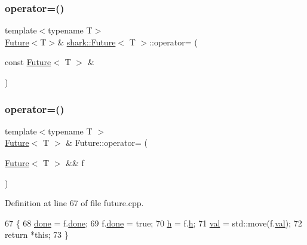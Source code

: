 \subsubsection{\texorpdfstring{operator=()}{operator=()}\hspace{0.1cm}{\footnotesize\ttfamily [1/2]}}
{\footnotesize\ttfamily template$<$typename T$>$ \\
\hyperlink{structshark_1_1_future}{Future}$<$T$>$\& \hyperlink{structshark_1_1_future}{shark\+::\+Future}$<$ T $>$\+::operator= (\begin{DoxyParamCaption}\item[{const \hyperlink{structshark_1_1_future}{Future}$<$ T $>$ \&}]{ }\end{DoxyParamCaption})\hspace{0.3cm}{\ttfamily [delete]}}

\hypertarget{structshark_1_1_future_a660602bfa8a6096020931f35f8d7a7a1}{}\label{structshark_1_1_future_a660602bfa8a6096020931f35f8d7a7a1} 
\subsubsection{\texorpdfstring{operator=()}{operator=()}\hspace{0.1cm}{\footnotesize\ttfamily [2/2]}}
{\footnotesize\ttfamily template$<$typename T $>$ \\
\hyperlink{structshark_1_1_future}{Future}$<$ T $>$ \& Future\+::operator= (\begin{DoxyParamCaption}\item[{\hyperlink{structshark_1_1_future}{Future}$<$ T $>$ \&\&}]{f }\end{DoxyParamCaption})}



Definition at line 67 of file future.\+cpp.


\begin{DoxyCode}
67                                              \{
68     \hyperlink{structshark_1_1_future_ae873cf93e919c066f04ff337ce3a21e1}{done} = f.\hyperlink{structshark_1_1_future_ae873cf93e919c066f04ff337ce3a21e1}{done};
69         f.\hyperlink{structshark_1_1_future_ae873cf93e919c066f04ff337ce3a21e1}{done} = \textcolor{keyword}{true};
70     \hyperlink{structshark_1_1_future_a54f00db085adbffb18b2e2ab9e3d4b32}{h} = f.\hyperlink{structshark_1_1_future_a54f00db085adbffb18b2e2ab9e3d4b32}{h};
71     \hyperlink{structshark_1_1_future_ad47e70b84ce6303568af0bd6aca991da}{val} = std::move(f.\hyperlink{structshark_1_1_future_ad47e70b84ce6303568af0bd6aca991da}{val});
72     \textcolor{keywordflow}{return} *\textcolor{keyword}{this};
73 \}
\end{DoxyCode}
\hypertarget{structshark_1_1_future_abbc3d1456a7c62296de4ec4603efac2a}{}\label{structshark_1_1_future_abbc3d1456a7c62296de4ec4603efac2a} 
